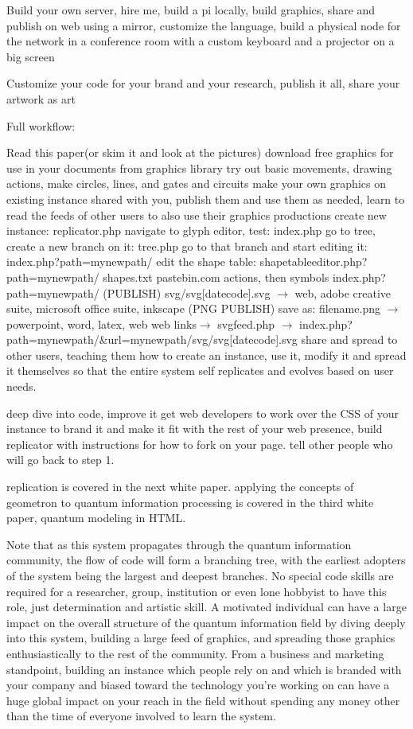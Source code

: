 \documentclass[11pt]{article}
\begin{document}
Build your own server, hire me, build a pi locally, build graphics, share and publish on web using a mirror, customize the language, build a physical node for the network in a conference room with a custom keyboard and a projector on a big screen 

Customize your code for your brand and your research, publish it all, share your artwork as art 





Full workflow:

Read this paper(or skim it and look at the pictures) 
download free graphics for use in your documents from graphics library
try out basic movements, drawing actions, make circles, lines, and gates and circuits
make your own graphics on existing instance shared with you, publish them and use them as needed, learn to read the feeds of other users to also use their graphics productions
create new instance:
replicator.php
navigate to glyph editor, test:
index.php
go to tree, create a new branch on it:
tree.php
go to that branch and start editing it:
index.php?path=mynewpath/
edit the shape table:
shapetableeditor.php?path=mynewpath/
shapes.txt
pastebin.com 
actions, then symbols
index.php?path=mynewpath/
(PUBLISH)
svg/svg[datecode].svg $\rightarrow$ web, adobe creative suite, microsoft office suite, inkscape
(PNG PUBLISH)
save as: filename.png $\rightarrow$ powerpoint, word, latex, web
web links$\rightarrow$ svgfeed.php $\rightarrow$ index.php?path=mynewpath/&url=mynewpath/svg/svg[datecode].svg
share and spread to other users, teaching them how to create an instance, use it, modify it and spread it themselves so that the entire system self replicates and evolves based on user needs.  

deep dive into code, improve it
get web developers to work over the CSS of your instance to brand it and make it fit with the rest of your web presence, build replicator with instructions for how to fork on your page. 
tell other people who will go back to step 1.

replication is covered in the next white paper.
applying the concepts of geometron to quantum information processing is covered in the third white paper, quantum modeling in HTML.

Note that as this system propagates through the quantum information community, the flow of code will form a branching tree, with the earliest adopters of the system being the largest and deepest branches.  No special code skills are required for a researcher, group, institution or even lone hobbyist to have this role, just determination and artistic skill.  A motivated individual can have a large impact on the overall structure of the quantum information field by diving deeply into this system, building a large feed of graphics, and spreading those graphics enthusiastically to the rest of the community.  From a business and marketing standpoint, building an instance which people rely on  and which is branded with your company and biased toward the technology you're working on can have a huge global impact on your reach in the field without spending any money other than the time of everyone involved to learn the system.  
\end{document}
